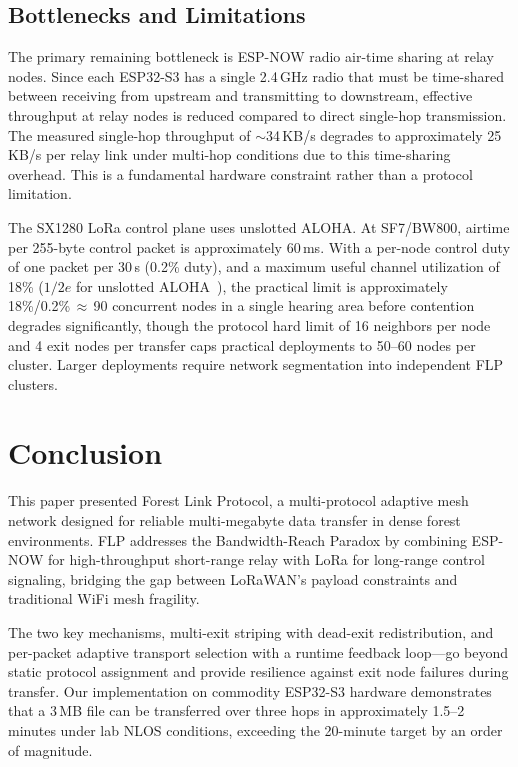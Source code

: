 \documentclass[conference]{IEEEtran}
\begin{document}
\subsection{Bottlenecks and Limitations}

The primary remaining bottleneck is ESP-NOW radio air-time sharing at relay nodes. Since each ESP32-S3 has a single 2.4\,GHz radio that must be time-shared between receiving from upstream and transmitting to downstream, effective throughput at relay nodes is reduced compared to direct single-hop transmission. The measured single-hop throughput of $\sim$34\,KB/s degrades to approximately 25\,KB/s per relay link under multi-hop conditions due to this time-sharing overhead. This is a fundamental hardware constraint rather than a protocol limitation.

The SX1280 LoRa control plane uses unslotted ALOHA. At SF7/BW800, airtime per 255-byte control packet is approximately 60\,ms. With a per-node control duty of one packet per 30\,s (0.2\% duty), and a maximum useful channel utilization of 18\% ($1/2e$ for unslotted ALOHA~\cite{abramson1970aloha}), the practical limit is approximately 18\%/0.2\%\,$\approx$\,90 concurrent nodes in a single hearing area before contention degrades significantly, though the protocol hard limit of 16 neighbors per node and 4 exit nodes per transfer caps practical deployments to 50--60 nodes per cluster. Larger deployments require network segmentation into independent FLP clusters.

\section{Conclusion}
\label{sec:conclusion}

This paper presented Forest Link Protocol, a multi-protocol adaptive mesh network designed for reliable multi-megabyte data transfer in dense forest environments. FLP addresses the Bandwidth-Reach Paradox by combining ESP-NOW for high-throughput short-range relay with LoRa for long-range control signaling, bridging the gap between LoRaWAN's payload constraints and traditional WiFi mesh fragility.

The two key mechanisms, multi-exit striping with dead-exit redistribution, and per-packet adaptive transport selection with a runtime feedback loop---go beyond static protocol assignment and provide resilience against exit node failures during transfer. Our implementation on commodity ESP32-S3 hardware demonstrates that a 3\,MB file can be transferred over three hops in approximately 1.5--2 minutes under lab NLOS conditions, exceeding the 20-minute target by an order of magnitude.
\end{document}
